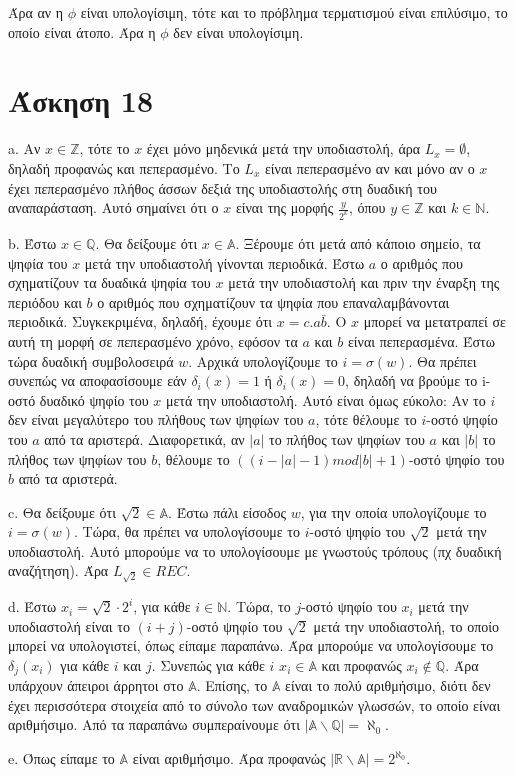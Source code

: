 \documentclass[a4paper, oneside, 11pt]{article}
\theoremstyle{definition}
\begin{document}
Άρα αν η $\phi$ είναι υπολογίσιμη, τότε και το πρόβλημα τερματισμού είναι επιλύσιμο, το οποίο είναι άτοπο.
Άρα η $\phi$ δεν είναι υπολογίσιμη.

\section*{Άσκηση 18}

a. Αν $x\in \mathbb{Z}$, τότε το $x$ έχει μόνο μηδενικά μετά την υποδιαστολή, άρα $L_x=\emptyset$,
δηλαδή προφανώς και πεπερασμένο. Το $L_x$ είναι πεπερασμένο αν και μόνο αν ο $x$ έχει πεπερασμένο
πλήθος άσσων δεξιά της υποδιαστολής στη δυαδική του αναπαράσταση. Αυτό σημαίνει ότι ο $x$ είναι της
μορφής $\frac{y}{2^k}$, όπου $y\in \mathbb{Z}$ και $k\in \mathbb{N}$.

b. Έστω $x\in \mathbb{Q}$. Θα δείξουμε ότι $x\in \mathbb{A}$. Ξέρουμε ότι μετά από κάποιο σημείο,
τα ψηφία του $x$ μετά την υποδιαστολή γίνονται περιοδικά. Έστω $a$ ο αριθμός που σχηματίζουν τα
δυαδικά ψηφία του $x$ μετά την υποδιαστολή και πριν την έναρξη της περιόδου και $b$ ο αριθμός που
σχηματίζουν τα ψηφία που επαναλαμβάνονται περιοδικά. Συγκεκριμένα, δηλαδή, έχουμε ότι
$x=c.a\bar{b}$. Ο $x$ μπορεί να μετατραπεί σε αυτή τη μορφή σε πεπερασμένο χρόνο, εφόσον τα $a$ και
$b$ είναι πεπερασμένα. Έστω τώρα δυαδική συμβολοσειρά $w$. Αρχικά υπολογίζουμε το $i=\sigma(w)$. 
Θα πρέπει συνεπώς να αποφασίσουμε εάν $\delta_i (x)=1$ ή $\delta_i (x)=0$, δηλαδή να βρούμε το 
i-οστό δυαδικό ψηφίο του $x$ μετά την υποδιαστολή. Αυτό είναι όμως εύκολο: Αν το $i$ δεν είναι μεγαλύτερο
του πλήθους των ψηφίων του $a$, τότε θέλουμε το $i$-οστό ψηφίο του $a$ από τα αριστερά. Διαφορετικά,
αν $|a|$ το πλήθος των ψηφίων του $a$ και $|b|$ το πλήθος των ψηφίων του $b$, θέλουμε το 
$((i-|a|-1) mod |b| + 1)$-οστό ψηφίο του $b$ από τα αριστερά. 

c. Θα δείξουμε ότι $\sqrt{2}\in \mathbb{A}$. Έστω πάλι είσοδος $w$, για την οποία υπολογίζουμε το 
$i=\sigma(w)$. Τώρα, θα πρέπει να υπολογίσουμε το $i$-οστό ψηφίο του $\sqrt{2}$ μετά την υποδιαστολή.
Αυτό μπορούμε να το υπολογίσουμε με γνωστούς τρόπους (πχ δυαδική αναζήτηση). Άρα $L_{\sqrt{2}}\in REC$.

d. Έστω $x_i=\sqrt{2}\cdot 2^i$, για κάθε $i\in \mathbb{N}$. Τώρα, το $j$-οστό ψηφίο του $x_i$ μετά την
υποδιαστολή είναι το $(i+j)$-οστό ψηφίο του $\sqrt{2}$ μετά την υποδιαστολή, το οποίο μπορεί να υπολογιστεί,
όπως είπαμε παραπάνω. Άρα μπορούμε να υπολογίσουμε το $\delta_j(x_i)$ για κάθε $i$ και $j$. Συνεπώς για κάθε
$i$ $x_i\in \mathbb{A}$ και προφανώς $x_i\notin \mathbb{Q}$. Άρα υπάρχουν άπειροι άρρητοι στο $\mathbb{A}$.
Επίσης, το $\mathbb{A}$ είναι το πολύ αριθμήσιμο, διότι δεν έχει περισσότερα στοιχεία από το σύνολο των
αναδρομικών γλωσσών, το οποίο είναι αριθμήσιμο. Από τα παραπάνω συμπεραίνουμε ότι $|\mathbb{A}\backslash\mathbb{Q}|=\aleph_0$.

e. Όπως είπαμε το $\mathbb{A}$ είναι αριθμήσιμο. Άρα προφανώς $|\mathbb{R}\backslash\mathbb{A}|=2^{\aleph_0}$.
\end{document}
